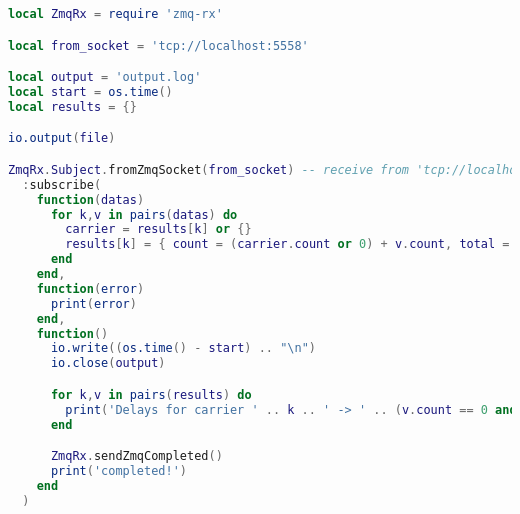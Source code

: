 \begin{lstlisting}[language=LUA,caption={Process pipeline with Zmq-RxLua: printer.},label=rx-processing-print-result]
local ZmqRx = require 'zmq-rx'

local from_socket = 'tcp://localhost:5558'

local output = 'output.log'
local start = os.time()
local results = {}

io.output(file)

ZmqRx.Subject.fromZmqSocket(from_socket) -- receive from 'tcp://localhost:5558'
  :subscribe(
    function(datas)
      for k,v in pairs(datas) do
        carrier = results[k] or {}
        results[k] = { count = (carrier.count or 0) + v.count, total = (carrier.total or 0) + v.total }
      end
    end,
    function(error)
      print(error)
    end,
    function()
      io.write((os.time() - start) .. "\n")
      io.close(output)

      for k,v in pairs(results) do
        print('Delays for carrier ' .. k .. ' -> ' .. (v.count == 0 and 0 or (v.total / v.count)) .. ' average mins - ' .. math.tointeger(v.count) .. " delayed flights")
      end

      ZmqRx.sendZmqCompleted()
      print('completed!')
    end
  )
\end{lstlisting}
